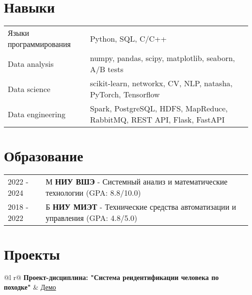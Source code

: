 \documentclass[a4paper,12pt]{article}
\begin{document}

\section{Навыки}
\begin{tabularx}{\linewidth}{@{}l X@{}}
Языки программирования &  \normalsize{Python, SQL, C/C++}\\
Data analysis  &  \normalsize{numpy, pandas, scipy, matplotlib, seaborn, A/B tests}\\ 
Data science  &  \normalsize{scikit-learn, networkx, CV, NLP, natasha, PyTorch, Tensorflow}\\ 
Data engineering  &  \normalsize{Spark, PostgreSQL, HDFS, MapReduce, RabbitMQ, REST API, Flask, FastAPI}\\  

\end{tabularx}



\section{Образование}
\begin{tabularx}{\linewidth}{@{}l X@{}}	
2022 - 2024 & М \textbf{НИУ ВШЭ} - Системный анализ и математические технологии \hfill \normalsize (GPA: 8.8/10.0) \\

2018 - 2022 & Б  \textbf{ НИУ МИЭТ} - Технические средства автоматизации и управления \hfill \normalsize (GPA: 4.8/5.0) \\ 

\end{tabularx}


\section{Проекты}

\begin{tabularx}{\linewidth}{ @{}l r@{} }
\textbf{Проект-дисциплина: "Система реидентификации человека по походке"} & \hfill \href{https://drive.google.com/file/d/1IwEmdHyyXWQlCG_Hfhxn1D-F65usrVAS/view?usp=sharing}{Демо} \\[3.75pt]
  \\
\end{tabularx}
\end{document}
